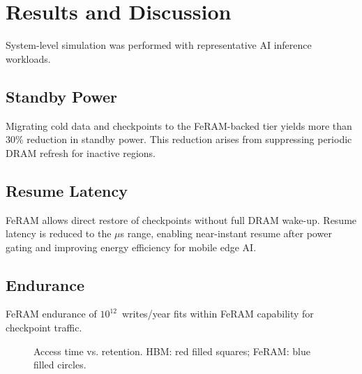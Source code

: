\section{Results and Discussion}
System-level simulation was performed with representative AI inference workloads.

\subsection{Standby Power}
Migrating cold data and checkpoints to the FeRAM-backed tier yields more than 30\% reduction in standby power.
This reduction arises from suppressing periodic DRAM refresh for inactive regions.

\subsection{Resume Latency}
FeRAM allows direct restore of checkpoints without full DRAM wake-up.
Resume latency is reduced to the $\mu$s range, enabling near-instant resume after power gating and improving energy efficiency for mobile edge AI.

\subsection{Endurance}
FeRAM endurance of $10^{12}$~writes/year fits within FeRAM capability for checkpoint traffic.

\begin{figure}[t]
\centering
{}
\vspace{-2mm}
\caption{Access time vs. retention. HBM: red filled squares; FeRAM: blue filled circles.}
\label{fig:retention}
\end{figure}
